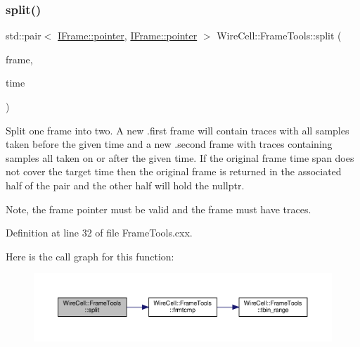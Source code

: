 \subsubsection{\texorpdfstring{split()}{split()}}
{\footnotesize\ttfamily std\+::pair$<$ \hyperlink{class_wire_cell_1_1_i_data_aff870b3ae8333cf9265941eef62498bc}{I\+Frame\+::pointer}, \hyperlink{class_wire_cell_1_1_i_data_aff870b3ae8333cf9265941eef62498bc}{I\+Frame\+::pointer} $>$ Wire\+Cell\+::\+Frame\+Tools\+::split (\begin{DoxyParamCaption}\item[{\hyperlink{class_wire_cell_1_1_i_data_aff870b3ae8333cf9265941eef62498bc}{I\+Frame\+::pointer}}]{frame,  }\item[{double}]{time }\end{DoxyParamCaption})}

Split one frame into two. A new .first frame will contain traces with all samples taken before the given time and a new .second frame with traces containing samples all taken on or after the given time. If the original frame time span does not cover the target time then the original frame is returned in the associated half of the pair and the other half will hold the nullptr.

Note, the frame pointer must be valid and the frame must have traces. 

Definition at line 32 of file Frame\+Tools.\+cxx.

Here is the call graph for this function\+:
\nopagebreak
\begin{figure}[H]
\begin{center}
\leavevmode
\includegraphics[width=350pt]{namespace_wire_cell_1_1_frame_tools_a23aeb7045b99ef40f3c5ca79549e4f8f_cgraph}
\end{center}
\end{figure}
\mbox{\label{namespace_wire_cell_1_1_frame_tools_ab75409594f96814edb45d39db9d705f6}} 

